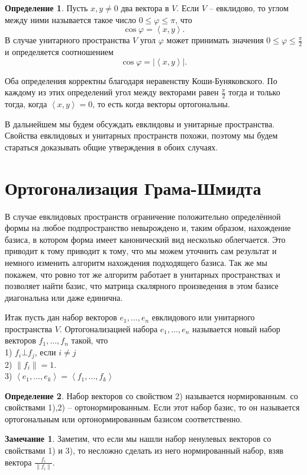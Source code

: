 \documentclass[10pt,a4paper,oneside]{book} %
\theoremstyle{definition}
\newtheorem*{rem}{Замечание}
\newtheorem*{defn}{Определение}
\def\ffi{\varphi}
\def\lan{\left\langle }
\def\ran{\right\rangle}
\def\dfn{\begin{defn}}
\def\edfn{\end{defn}}
\def\rm{\begin{rem}}
\def\erm{\end{rem}}
\begin{document}
\dfn Пусть $x,y\neq 0$ два вектора в $V$. Если $V$ -- евклидово, то углом между ними называется такое число $0\leq\ffi\leq \pi$, что 
$$\cos\ffi = \lan x,y\ran.$$
В случае унитарного пространства $V$ угол $\ffi$ может принимать значения $0\leq \ffi \leq \frac{\pi}{2}$ и определяется соотношением
$$\cos\ffi = |\lan x,y\ran|.$$
\edfn

Оба определения корректны благодаря неравенству Коши-Буняковского. По каждому из этих определений угол между векторами равен $\frac{\pi}{2}$ тогда и только тогда, когда $\lan x,y 
\ran=0$, то есть когда векторы ортогональны. 

В дальнейшем мы будем обсуждать  евклидовы и унитарные пространства. Свойства евклидовых и унитарных пространств похожи, поэтому  мы будем стараться доказывать общие утверждения в обоих случаях.


\section{Ортогонализация Грама-Шмидта}

В случае евклидовых пространств ограничение положительно определённой формы на любое подпространство невырождено и, таким образом, нахождение базиса, в котором форма имеет канонический вид несколько облегчается.  Это приводит к тому приводит к тому, что мы можем уточнить сам результат и немного изменить алгоритм нахождения подходящего базиса. Так же мы покажем, что ровно тот же алгоритм работает в унитарных пространствах и позволяет найти базис, что матрица скалярного произведения в этом базисе диагональна или даже единична.

Итак пусть дан набор векторов $e_1,\dots, e_n $ евклидового или унитарного пространства $V$. Ортогонализацией набора $e_1,\dots,e_n$ называется  новый набор векторов $f_1,\dots,f_n$ такой, что\\
1) $f_i \bot f_j$, если $i\neq j$\\
2) $\|f_i\|=1$.\\
3) $\lan e_1,\dots,e_k\ran=\lan f_1,\dots,f_k\ran$\\


\dfn Набор векторов со свойством 2)
называется нормированным. со свойствами 1),2) -- ортонормированным. Если этот набор базис, то он называется ортогональным или ортонормированным базисом соответственно.
\edfn 

\rm Заметим, что если мы нашли набор ненулевых векторов со свойствами 1) и 3), то несложно сделать из него нормированный набор, взяв вектора $\frac{f_i}{\|f_i\|}$. 
\erm
\end{document}
